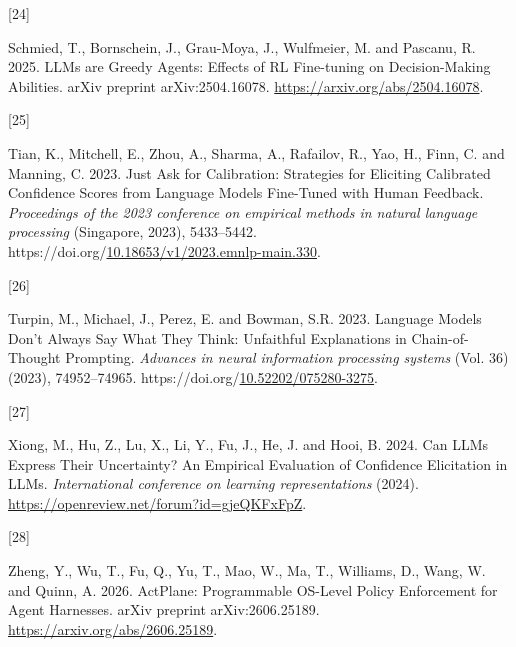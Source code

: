 \documentclass[
  11pt,
]{article}
\newlength{\cslhangindent}
\newlength{\csllabelwidth}
\newenvironment{CSLReferences}[2] %
 {\begin{list}{}{%
  \setlength{\itemindent}{0pt}
  \setlength{\leftmargin}{0pt}
  \setlength{\parsep}{0pt}
  \ifodd #1
   \setlength{\leftmargin}{\cslhangindent}
   \setlength{\itemindent}{-1\cslhangindent}
  \fi
  \setlength{\itemsep}{#2\baselineskip}}}
 {\end{list}}
\newcommand{\CSLLeftMargin}[1]{\parbox[t]{\csllabelwidth}{\strut#1\strut}}
\newcommand{\CSLRightInline}[1]{\parbox[t]{\linewidth - \csllabelwidth}{\strut#1\strut}}
\begin{document}
\begin{CSLReferences}{0}{0}
\CSLLeftMargin{{[}24{]} }%
\CSLRightInline{Schmied, T., Bornschein, J., Grau-Moya, J., Wulfmeier, M. and Pascanu, R. 2025. {LLMs are Greedy Agents: Effects of RL Fine-tuning on Decision-Making Abilities}. arXiv preprint arXiv:2504.16078. \url{https://arxiv.org/abs/2504.16078}.}

\CSLLeftMargin{{[}25{]} }%
\CSLRightInline{Tian, K., Mitchell, E., Zhou, A., Sharma, A., Rafailov, R., Yao, H., Finn, C. and Manning, C. 2023. {Just Ask for Calibration: Strategies for Eliciting Calibrated Confidence Scores from Language Models Fine-Tuned with Human Feedback}. \emph{Proceedings of the 2023 conference on empirical methods in natural language processing} (Singapore, 2023), 5433--5442. https://doi.org/\href{https://doi.org/10.18653/v1/2023.emnlp-main.330}{10.18653/v1/2023.emnlp-main.330}.}

\CSLLeftMargin{{[}26{]} }%
\CSLRightInline{Turpin, M., Michael, J., Perez, E. and Bowman, S.R. 2023. {Language Models Don't Always Say What They Think: Unfaithful Explanations in Chain-of-Thought Prompting}. \emph{Advances in neural information processing systems} (Vol. 36) (2023), 74952--74965. https://doi.org/\href{https://doi.org/10.52202/075280-3275}{10.52202/075280-3275}.}

\CSLLeftMargin{{[}27{]} }%
\CSLRightInline{Xiong, M., Hu, Z., Lu, X., Li, Y., Fu, J., He, J. and Hooi, B. 2024. {Can LLMs Express Their Uncertainty? An Empirical Evaluation of Confidence Elicitation in LLMs}. \emph{International conference on learning representations} (2024). \url{https://openreview.net/forum?id=gjeQKFxFpZ}.}

\CSLLeftMargin{{[}28{]} }%
\CSLRightInline{Zheng, Y., Wu, T., Fu, Q., Yu, T., Mao, W., Ma, T., Williams, D., Wang, W. and Quinn, A. 2026. {ActPlane: Programmable OS-Level Policy Enforcement for Agent Harnesses}. arXiv preprint arXiv:2606.25189. \url{https://arxiv.org/abs/2606.25189}.}

\end{CSLReferences}
\end{document}
